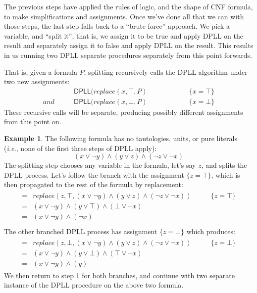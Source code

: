 \documentclass{article}
\theoremstyle{definition}
\newtheorem{example}{Example}
\newcommand{\ie}{\emph{i.e.}}
\newcommand{\subst}[3]{\textit{replace}(#2, #1, #3)}
\begin{document}
The previous steps have applied the rules of logic, and the shape
of CNF formula, to make simplifications and assignments. Once we've
done all that we can with those steps, the last step falls back to 
a ``brute force'' approach. We pick a variable, and ``split it'', that is,
we assign it to be true and apply DPLL on the result and separately 
assign it to false and apply DPLL on the result. This results
in us running two DPLL separate procedures separately from this
point forwards.

That is, given a formula $P$, splitting recursively calls the
DPLL algorithm under two new assignments:
%
\begin{align*}
             & \textsf{DPLL}(\subst{\top}{x}{P} \qquad\qquad\qquad \{x =
               \top\}  \\
\textit{and} \qquad &  \textsf{DPLL}(\subst{\bot}{x}{P} \qquad\qquad\qquad \{x = \bot\} 
\end{align*}
%
These recursive calls will be separate, producing
possibly different assignments from this point on.

\begin{example}
The following formula has no tautologies, units, or pure literals
(\ie{}, none of the first three steps of DPLL apply):
%
\begin{equation*}
(x \vee \neg y) \wedge (y \vee z) \wedge (\neg z \vee \neg x)
\end{equation*}
%
The splitting step chooses any variable in the formula, let's say
$z$, and splits the DPLL process.
Let's follow the branch with the assignment $\{z = \top\}$, 
which is then propagated to the rest of the formula by replacement:
\begin{align*}
\begin{array}{rll}
= & \subst{\top}{z}{(x \vee \neg y) \wedge (y \vee z) \wedge (\neg z \vee \neg x)}
& \qquad \{z = \top\} \\
= & (x \vee \neg y) \wedge (y \vee \top) \wedge (\bot \vee \neg x) \\
= & (x \vee \neg y) \wedge (\neg x) \\
\end{array}
\end{align*}
The other branched DPLL process has assignment $\{z = \bot\}$ which
produces:
%
\begin{align*}
\begin{array}{rll}
= & \subst{\bot}{z}{(x \vee \neg y) \wedge (y \vee z) \wedge (\neg z \vee \neg x)}
& \qquad \{z = \bot\} \\
= & (x \vee \neg y) \wedge (y \vee \bot) \wedge (\top \vee \neg x) \\
= & (x \vee \neg y) \wedge (y)
\end{array}
%
\end{align*}
We then return to step 1 for both branches, and continue with two
separate instance of the DPLL procedure on the above two formula.
%
\end{example}
\end{document}
